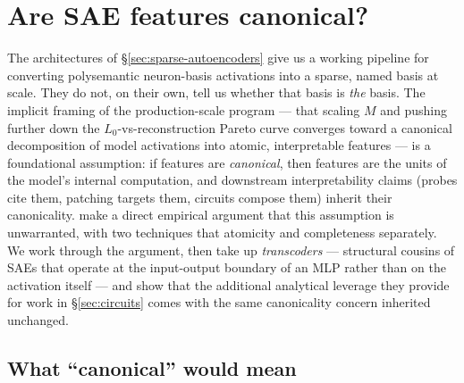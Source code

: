 
\section{Are SAE features canonical?}
\label{sec:sae-canonicality}
\label{sec:sae-canonical}

The architectures of \S\ref{sec:sparse-autoencoders} give us a working
pipeline for converting polysemantic neuron-basis activations into a
sparse, named  basis at scale. They do not, on their own, tell
us whether that basis is \emph{the} basis. The implicit framing of the
production-scale  program --- that scaling $M$ and pushing further
down the $L_0$-vs-reconstruction Pareto curve converges toward a
canonical decomposition of model activations into atomic, interpretable
features --- is a foundational assumption: if features are
\emph{canonical}, then  features are the units of the model's
internal computation, and downstream interpretability claims (probes
cite them, patching targets them, circuits compose them) inherit
their canonicality. \citet{leask2025-sae-not-canonical} make a direct
empirical argument that this assumption is unwarranted, with two
techniques that  atomicity and completeness separately. We work
through the argument, then take up \emph{transcoders}
\citep{dunefsky2024-transcoders} --- structural cousins of SAEs that
operate at the input-output boundary of an MLP rather than on the
activation itself --- and show that the additional analytical leverage
they provide for  work in \S\ref{sec:circuits} comes with the
same canonicality concern inherited unchanged.

\subsection{What ``canonical'' would mean}
\label{sec:canonical-definition}

